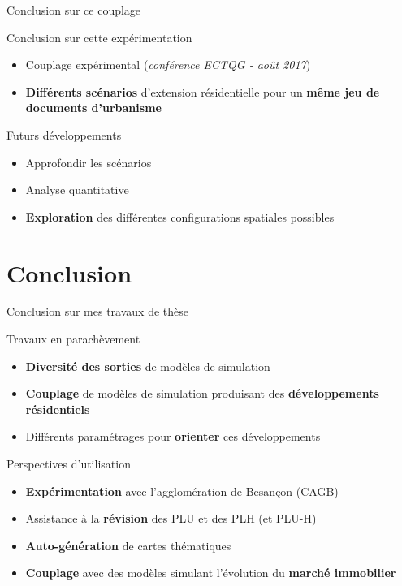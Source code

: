 \documentclass[xcolor=table]{beamer}
\begin{document}
\begin{frame}{Conclusion sur ce couplage}
	\begin{block}{Conclusion sur cette expérimentation}		
		\begin{itemize}
			\item Couplage expérimental (\textit{conférence ECTQG - août 2017})
			\item \textbf{Différents scénarios} d'extension résidentielle pour un \textbf{même jeu de documents d'urbanisme}
		\end{itemize}
	\end{block}
	\begin{block}{Futurs développements}		
		\begin{itemize}
			\item Approfondir les scénarios
			\item Analyse quantitative
			\item \textbf{Exploration} des différentes configurations spatiales possibles
		\end{itemize}
	\end{block}
\end{frame}

\section{Conclusion}

\begin{frame}{Conclusion sur mes travaux de thèse}
	\begin{block}{Travaux en parachèvement}
		\begin{itemize}
			\item \textbf{Diversité des sorties} de modèles de simulation
			\item \textbf{Couplage} de modèles de simulation produisant des \textbf{développements résidentiels}
			\item Différents paramétrages pour \textbf{orienter} ces développements
		\end{itemize}
	\end{block}
	\begin{block}{Perspectives d'utilisation}
		\begin{itemize}
			\item \textbf{Expérimentation} avec l'agglomération de Besançon (CAGB)
			\item Assistance à la \textbf{révision} des PLU et des PLH (et PLU-H)
			\item \textbf{Auto-génération} de cartes thématiques
			\item \textbf{Couplage} avec des modèles simulant l'évolution du \textbf{marché immobilier}
		\end{itemize}
	\end{block}			
\end{frame}
\end{document}
